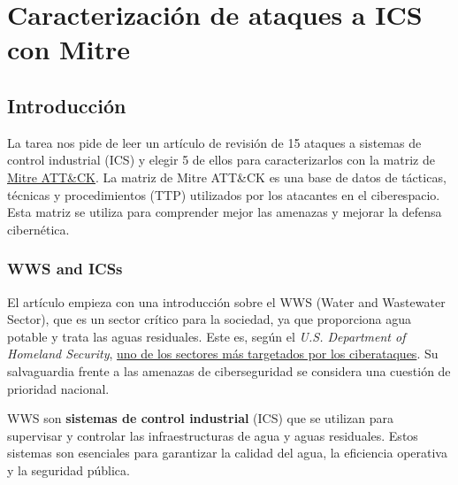 \chapter{Caracterización de ataques a ICS con Mitre}
\label{chap:01}
\section*{Introducción}

La tarea nos pide de leer un artículo de revisión de 15 ataques a sistemas de control industrial (ICS) y elegir 5 de ellos para caracterizarlos con la matriz de \href{attack.mitre.org/matrices/ics/}{Mitre ATT\&CK}. La matriz de Mitre ATT\&CK es una base de datos de tácticas, técnicas y procedimientos (TTP) utilizados por los atacantes en el ciberespacio. Esta matriz se utiliza para comprender mejor las amenazas y mejorar la defensa cibernética.


\subsection{\textsc{WWS} and ICSs}

El artículo empieza con una introducción sobre el \textsc{WWS} (Water and Wastewater Sector), que es un sector crítico para la sociedad, ya que proporciona agua potable y trata las aguas residuales. 
Este es, según el \textit{U.S. Department of Homeland Security}, \ul{uno de los sectores más targetados por los ciberataques}. Su salvaguardia frente a las amenazas de ciberseguridad se considera una cuestión de prioridad nacional.

\textsc{WWS} son \textbf{sistemas de control industrial} (\textsc{ICS}) que se utilizan para supervisar y controlar las infraestructuras de agua y aguas residuales. Estos sistemas son esenciales para garantizar la calidad del agua, la eficiencia operativa y la seguridad pública.

